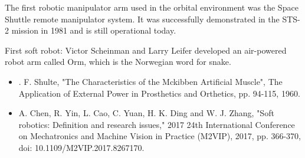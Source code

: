 
% 


The first robotic manipulator arm used in the orbital environment was the Space Shuttle remote manipulator system. It was successfully demonstrated in the STS-2 mission in 1981 and is still operational today.

First soft robot: Victor Scheinman and Larry Leifer developed an air-powered robot arm called Orm, which is the Norwegian word for snake.

\begin{itemize}
  \item . F. Shulte, "The Characteristics of the Mckibben Artificial Muscle", The Application of External Power in Prosthetics and Orthetics, pp. 94-115, 1960.
  \item A. Chen, R. Yin, L. Cao, C. Yuan, H. K. Ding and W. J. Zhang, "Soft robotics: Definition and research issues," 2017 24th International Conference on Mechatronics and Machine Vision in Practice (M2VIP), 2017, pp. 366-370, doi: 10.1109/M2VIP.2017.8267170.
\end{itemize}
